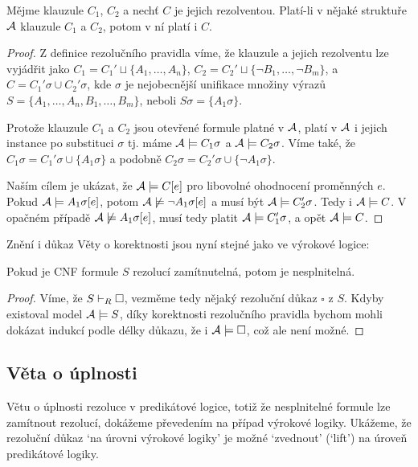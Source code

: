 \begin{proposition}
Mějme klauzule $C_1$, $C_2$ a nechť $C$ je jejich rezolventou. Platí-li v nějaké struktuře $\mathcal{A}$ klauzule $C_1$ a $C_2$, potom v ní platí i $C$.
\end{proposition}
\begin{proof}
Z definice rezolučního pravidla víme, že klauzule a jejich rezolventu lze vyjádřit jako $C_1=C_1'\sqcup \{A_1,\dots,A_n\}$, $C_2=C_2'\sqcup \{\neg B_1,\dots,\neg B_m\}$, a $C=C_1'\sigma \cup C_2'\sigma$, kde $\sigma$ je
nejobecnější unifikace množiny výrazů $S=\{A_1,\dots,A_n,B_1,\dots,B_m\}$, neboli $S\sigma=\{A_1\sigma\}$.

Protože klauzule $C_1$ a $C_2$ jsou otevřené formule platné v $\mathcal{A}$, platí v $\mathcal{A}$ i jejich instance po substituci $\sigma$ tj. máme $\mathcal{A}\models C_1\sigma$ a $\mathcal{A}\models C_2\sigma$. Víme také, že $C_1\sigma=C_1'\sigma \cup \{A_1\sigma\}$ a podobně $C_2\sigma=C_2'\sigma \cup \{\neg A_1\sigma\}$.

Naším cílem je ukázat, že $\mathcal{A}\models C[e]$ pro libovolné ohodnocení proměnných $e$. Pokud $\mathcal{A}\models A_1\sigma[e]$, potom $\mathcal{A}\not\models\neg A_1\sigma[e]$ a musí být $\mathcal{A}\models C_2'\sigma$. Tedy i $\mathcal{A}\models C$. V opačném případě $\mathcal{A}\not\models A_1\sigma[e]$, musí tedy platit $\mathcal{A}\models C_1'\sigma$, a opět $\mathcal{A}\models C$.
\end{proof}

Znění i důkaz Věty o korektnosti jsou nyní stejné jako ve výrokové logice:

\begin{theorem}\label{theorem:soundness-of-predicate-resolution}
    Pokud je CNF formule $S$ rezolucí zamítnutelná, potom je nesplnitelná.
\end{theorem}
\begin{proof}
    Víme, že $S\vdash_R\square$, vezměme tedy nějaký rezoluční důkaz $\square$ z $S$. Kdyby existoval model $\mathcal{A}\models S$, díky korektnosti rezolučního pravidla bychom mohli dokázat indukcí podle délky důkazu, že i $\mathcal{A}\models\square$, což ale není možné.
\end{proof}


\subsection{Věta o úplnosti}

Větu o úplnosti rezoluce v predikátové logice, totiž že nesplnitelné formule lze zamítnout rezolucí, dokážeme převedením na případ výrokové logiky. Ukážeme, že rezoluční důkaz `na úrovni výrokové logiky' je možné `zvednout' (`lift') na úroveň predikátové logiky.

